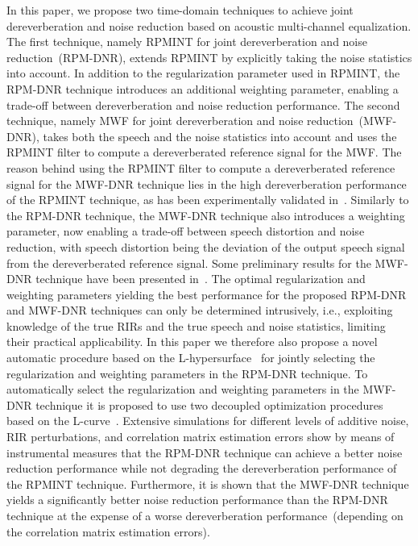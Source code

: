 \documentclass[10pt]{IEEEtran}
\begin{document}
In this paper, we propose two time-domain techniques to achieve joint dereverberation and noise reduction based on acoustic multi-channel equalization. 
{{The first technique, namely RPMINT for joint dereverberation and noise reduction~(RPM-DNR), extends RPMINT by explicitly taking the noise statistics into account.}}
In addition to the regularization parameter used in RPMINT, the RPM-DNR technique introduces an additional weighting parameter, enabling a trade-off between dereverberation and noise reduction performance. 
The second technique, namely MWF for joint dereverberation and noise reduction~(MWF-DNR), takes both the speech and the noise statistics into account and uses the RPMINT filter to compute a dereverberated reference signal for the MWF.
{{The reason behind using the RPMINT filter to compute a dereverberated reference signal for the MWF-DNR technique lies in the high dereverberation performance of the RPMINT technique, as has been experimentally validated in~\cite{Kodrasi_ITASLP_2013}.}}
Similarly to the RPM-DNR technique, the MWF-DNR technique also introduces a weighting parameter, now enabling a trade-off between speech distortion and noise reduction, with speech distortion being the deviation of the output speech signal from the dereverberated reference signal.
Some preliminary results for the MWF-DNR technique have been presented in~\cite{Kodrasi_IWAENC_2014}.
{{The optimal regularization and weighting parameters yielding the best performance for the proposed RPM-DNR and MWF-DNR techniques can only be determined intrusively, i.e., exploiting knowledge of the true RIRs and the true speech and noise statistics, limiting their practical applicability.
In this paper we therefore also propose a novel automatic procedure based on the L-hypersurface~\cite{Belge_SPIE_1998} for jointly selecting the regularization and weighting parameters in the RPM-DNR technique.}}
To automatically select the regularization and weighting parameters in the MWF-DNR technique it is proposed to use two decoupled optimization procedures based on the L-curve~\cite{Hansen_1993}.
Extensive simulations for different levels of additive noise, RIR perturbations, and correlation matrix estimation errors show by means of instrumental measures that the RPM-DNR technique can achieve a better noise reduction performance while not degrading the dereverberation performance of the RPMINT technique.
Furthermore, it is shown that the MWF-DNR technique yields a significantly better noise reduction performance than the RPM-DNR technique at the expense of a worse dereverberation performance~(depending on the correlation matrix estimation errors).
\end{document}
